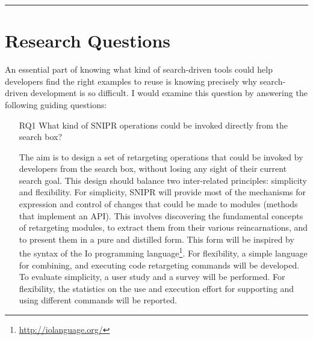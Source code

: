 \fancybreak{\pfbreakdisplay}

\section{Research Questions}
\label{sec:questions}

An essential part of knowing what kind of search-driven tools could help developers find the right examples to reuse is knowing precisely why search-driven development is so difficult. I would examine this question by answering the following guiding questions: 

\begin{itemize}
	
	\item[RQ1] What kind of \uppercase{SnipR} operations could be invoked directly from the search 
	box? 
	
	The aim is to design a set of retargeting operations that could be invoked by developers from the 
	search box, without losing any sight of their current search goal. This design should balance 
	two inter-related principles: simplicity and flexibility. For simplicity, SNIPR will provide 
	most of the mechanisms for expression and control of changes that could be made to modules 
	(methods that implement an API). This involves discovering the fundamental concepts of 
	retargeting modules, to extract them from their various reincarnations, and to present them in a 
	pure and distilled form. This form will be inspired by the syntax of the Io programming 
	language\footnote{\url{http://iolanguage.org/}}. For flexibility, a simple language for combining, and 
	executing code retargeting commands will be developed. To evaluate simplicity, a user study and a survey will 
	be performed. For flexibility, the statistics on the use and execution effort for supporting and using 
	different commands will be reported.
		

\end{itemize}
